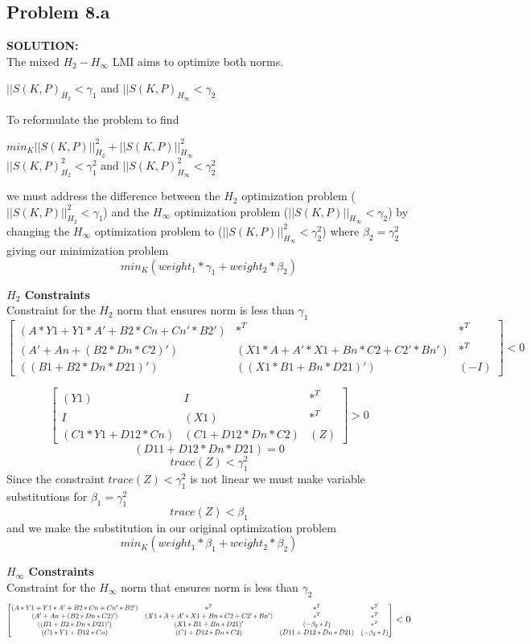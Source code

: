 \documentclass[10pt,a4paper]{article}
\newcommand\scalemath[2]{\scalebox{#1}{\mbox{\ensuremath{\displaystyle #2}}}}
\begin{document}
\subsection{Problem 8.a}
\begin{tcolorbox}
\textbf{SOLUTION:}\\

The mixed $H_2-H_\infty$ LMI aims to optimize both norms.  
\begin{center}
$||S(K,P)_{H_2}<\gamma_1$ and $||S(K,P)_{H_{\infty}}<\gamma_2$
\end{center}
To reformulate the problem to find
\begin{center}
$min_K||S(K,P)||^2_{H_2}+||S(K,P)||^2_{H_\infty}$\\
$||S(K,P)^2_{H_2}<\gamma_1^2$ and $||S(K,P)^2_{H_{\infty}}<\gamma_2^2$
\end{center}
we must address the difference between the $H_2$ optimization problem ($||S(K,P)||^2_{H_2}<\gamma_1$) and the $H_\infty$ optimization problem ($||S(K,P)||_{H_\infty}<\gamma_2$) by changing the $H_\infty$ optimization problem to ($||S(K,P)||^2_{H_\infty}<\gamma^2_2$) where $\beta_2=\gamma^2_2$ giving our minimization problem
$$min_K(weight_1*\gamma_1+weight_2*\beta_2)$$


\textbf{$H_2$ Constraints}\\
Constraint for the $H_2$ norm that ensures norm is less than $\gamma_1$
$$\begin{bmatrix}
(A*Y1+Y1*A'+B2*Cn+Cn'*B2')&  *^T& *^T\\
(A'+An+(B2*Dn*C2)')& (X1*A+A'*X1+Bn*C2+C2'*Bn')&  *^T\\
((B1+B2*Dn*D21)')& ((X1*B1+Bn*D21)')& (-I)
\end{bmatrix}<0$$

$$\begin{bmatrix}
(Y1)&  I&  *^T\\
I&  (X1)&  *^T\\
(C1*Y1+D12*Cn)&	(C1+D12*Dn*C2)&	(Z)
\end{bmatrix}>0
$$
$$(D11+D12*Dn*D21)=0$$
$$trace(Z)<\gamma_1^2$$
Since the constraint $trace(Z) < \gamma_1^2$ is not linear we must make variable substitutions for $\beta_1 = \gamma_1^2$\\
$$trace(Z)<\beta_1$$
and we make the substitution in our original optimization problem
$$min_K(weight_1*\beta_1+weight_2*\beta_2)$$

\textbf{$H_\infty$ Constraints}\\
Constraint for the $H_\infty$ norm that ensures norm is less than $\gamma_2$\\
$$\scalemath{0.7}{\begin{bmatrix}
(A*Y1+Y1*A'+B2*Cn+Cn'*B2')&  *^T&	*^T&	*^T\\
(A'+An+(B2*Dn*C2)')&	(X1*A+A'*X1+Bn*C2+C2'*Bn')&	*^T&	*^T\\
((B1+B2*Dn*D21)')&	(X1*B1+Bn*D21)'&	(-\beta_2*I)&	*^T\\
(C1*Y1+D12*Cn)&	(C1+D12*Dn*C2)&	(D11+D12*Dn*D21)&	(-\beta_2*I)
\end{bmatrix}}<0
$$


\end{tcolorbox}
\end{document}
